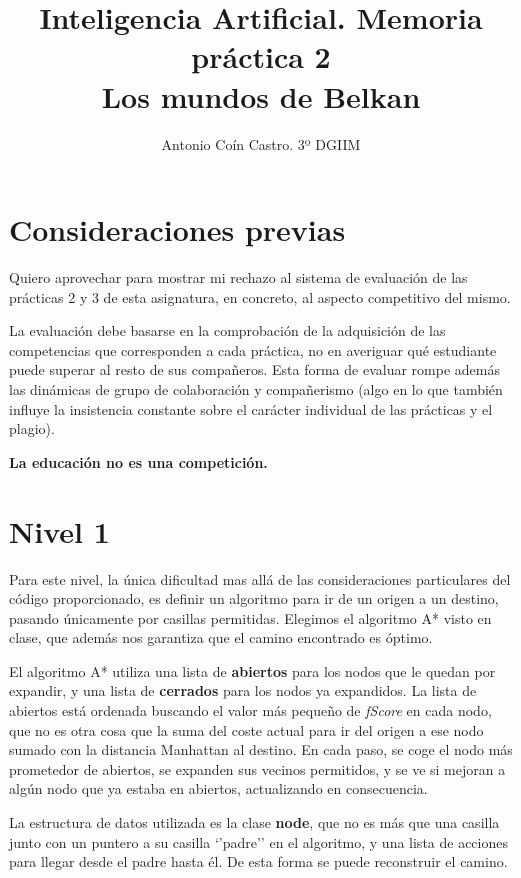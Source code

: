 \documentclass[11pt,a4paper]{article}
\title{Inteligencia Artificial. Memoria práctica 2 \\ \Large{Los mundos de Belkan}}
\author{Antonio Coín Castro. 3º DGIIM}
\date{}
\begin{document}
\maketitle

\section*{Consideraciones previas}%
\label{sec:consideraciones_previas}

Quiero aprovechar para mostrar mi rechazo al sistema de evaluación de las prácticas 2 y 3 de esta asignatura, en concreto, al aspecto competitivo del mismo.

La evaluación debe basarse en la comprobación de la adquisición de las competencias que corresponden a cada práctica, no en averiguar qué estudiante puede superar al resto de sus compañeros. Esta forma de evaluar rompe además las dinámicas de grupo de colaboración y compañerismo (algo en lo que también influye la insistencia constante sobre el carácter individual de las prácticas y el plagio). 

\textbf{La educación no es una competición.} 

\section*{Nivel 1}

Para este nivel, la única dificultad mas allá de las consideraciones particulares del código proporcionado, es definir un algoritmo para ir de un origen a un destino, pasando únicamente por casillas permitidas. Elegimos el algoritmo A* visto en clase, que además nos garantiza que el camino encontrado es óptimo.

El algoritmo A* utiliza una lista de \textbf{abiertos} para los nodos que le quedan por expandir, y una lista de \textbf{cerrados} para los nodos ya expandidos. La lista de abiertos está ordenada buscando el valor más pequeño de \textit{fScore} en cada nodo, que no es otra cosa que la suma del coste actual para ir del origen a ese nodo sumado con la distancia Manhattan al destino. En cada paso, se coge el nodo más prometedor de abiertos, se expanden sus vecinos permitidos, y se ve si mejoran a algún nodo que ya estaba en abiertos, actualizando en consecuencia.

La estructura de datos utilizada es la clase \textbf{node}, que no es más que una casilla junto con un puntero a su casilla `'padre'' en el algoritmo, y una lista de acciones para llegar desde el padre hasta él. De esta forma se puede reconstruir el camino.
\end{document}
